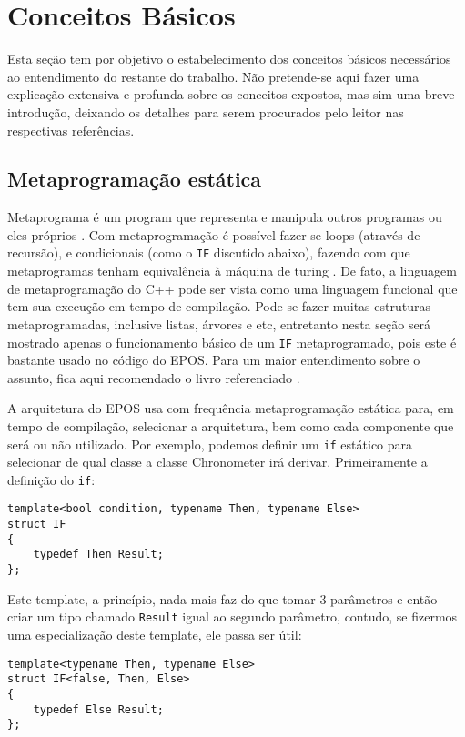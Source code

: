 \chapter{Conceitos Básicos}

Esta seção tem por objetivo o estabelecimento dos conceitos básicos necessários ao entendimento do restante do trabalho. Não pretende-se aqui fazer uma explicação extensiva e profunda sobre os conceitos expostos, mas sim uma breve introdução, deixando os detalhes para serem procurados pelo leitor nas respectivas referências.


\section{Metaprogramação estática}
Metaprograma é um program que representa e manipula outros programas ou eles próprios \cite{generative}.
Com metaprogramação é possível fazer-se loops (através de recursão), e condicionais (como o \verb+IF+ discutido abaixo), fazendo com que metaprogramas tenham equivalência à máquina de turing \cite{generative}. De fato, a linguagem de metaprogramação do C++ pode ser vista como uma linguagem funcional que tem sua execução em tempo de compilação. Pode-se fazer muitas estruturas metaprogramadas, inclusive listas, árvores e etc, entretanto nesta seção será mostrado apenas o funcionamento básico de um \verb+IF+ metaprogramado, pois este é bastante usado no código do EPOS. Para um maior entendimento sobre o assunto, fica aqui recomendado o livro referenciado \cite{generative}.

A arquitetura do EPOS usa com frequência metaprogramação estática para, em tempo de compilação, selecionar a arquitetura, bem como cada componente que será ou não utilizado. Por exemplo, podemos definir um \verb+if+ estático para selecionar de qual classe a classe Chronometer irá derivar. Primeiramente a definição do \verb+if+:

\begin{lstlisting}
template<bool condition, typename Then, typename Else>
struct IF
{
    typedef Then Result;
};
\end{lstlisting}

Este template, a princípio, nada mais faz do que tomar 3 parâmetros e então criar um tipo chamado \verb+Result+ igual ao segundo parâmetro, contudo, se fizermos uma especialização deste template, ele passa ser útil:

\begin{lstlisting}
template<typename Then, typename Else>
struct IF<false, Then, Else>
{
    typedef Else Result;
};
\end{lstlisting}


